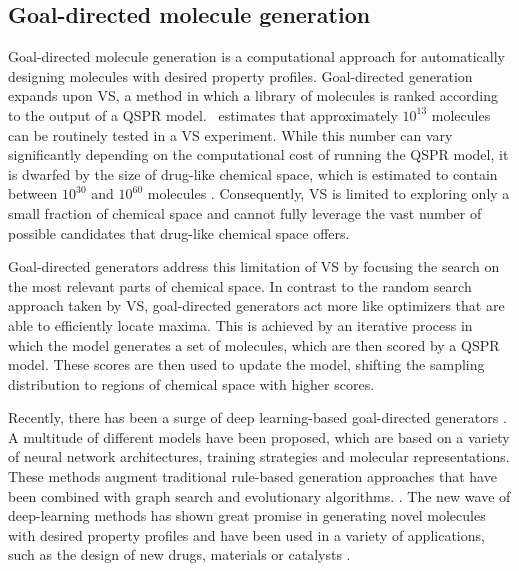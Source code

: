 \subsection{Goal-directed molecule generation}
Goal-directed molecule generation \citep{schneiderNovoMolecularDesign2013} is a computational
approach for automatically designing molecules with desired property profiles. Goal-directed
generation expands upon \ac{VS}, a method in which a library of molecules is ranked according to the
output of a \ac{QSPR} model.\ \citet{waltersVirtualChemicalLibraries2019} estimates that
approximately $10^{13}$ molecules can be routinely tested in a \ac{VS} experiment. While this number
can vary significantly depending on the computational cost of running the \ac{QSPR} model, it is
dwarfed by the size of drug-like chemical space, which is estimated to contain between $10^{30}$ and
$10^{60}$ molecules \citep{waltersVirtualChemicalLibraries2019,ruddigkeitEnumeration166Billion2012}.
Consequently, \ac{VS} is limited to exploring only a small fraction of chemical space and cannot
fully leverage the vast number of possible candidates that drug-like chemical space offers.

Goal-directed generators address this limitation of \ac{VS} by focusing the search on the most
relevant parts of chemical space. In contrast to the random search approach taken by \ac{VS},
goal-directed generators act more like optimizers that are able to efficiently locate maxima. This
is achieved by an iterative process in which the model generates a set of molecules, which are then
scored by a \ac{QSPR} model. These scores are then used to update the model, shifting the sampling
distribution to regions of chemical space with higher scores.

Recently, there has been a surge of deep learning-based goal-directed generators
\citep{eltonDeepLearningMolecular2019,sanchez-lengelingInverseMolecularDesign2018,duMachineLearningaidedGenerative2024}.
A multitude of different models have been proposed, which are based on a variety of neural network
architectures, training strategies and molecular representations. These methods augment traditional
rule-based generation approaches that have been combined with graph search and evolutionary
algorithms. \citep{schneiderComputerbasedNovoDesign2005,schneiderNovoMolecularDesign2013}. The new
wave of deep-learning methods has shown great promise in generating novel molecules with desired
property profiles and have been used in a variety of applications, such as the design of new drugs,
materials or catalysts \citep{todo}.

